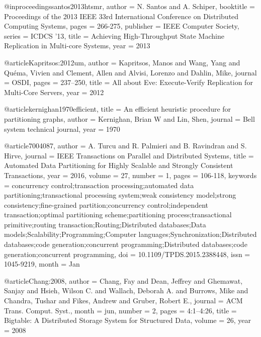 





@inproceedings{santos2013htsmr,
  author    = {N. Santos and A. Schiper},
  booktitle = {Proceedings of the 2013 IEEE 33rd International Conference on Distributed Computing Systems},
  pages     = {266-275},
  publisher = {{IEEE} Computer Society},
  series    = {ICDCS '13},
  title     = {Achieving High-Throughput State Machine Replication in Multi-core Systems},
  year      = {2013}
}

@article{Kapritsos:2012um,
  author  = {Kapritsos, Manos and Wang, Yang and Qu{\'e}ma, Vivien and Clement, Allen and Alvisi, Lorenzo and Dahlin, Mike},
  journal = {OSDI},
  pages   = {237--250},
  title   = {{All about Eve: Execute-Verify Replication for Multi-Core Servers}},
  year    = {2012}
}

@article{kernighan1970efficient,
  title   = {An efficient heuristic procedure for partitioning graphs},
  author  = {Kernighan, Brian W and Lin, Shen},
  journal = {Bell system technical journal},
  year    = {1970}
}

@article{7004087,
  author   = {A. {Turcu} and R. {Palmieri} and B. {Ravindran} and S. {Hirve}},
  journal  = {IEEE Transactions on Parallel and Distributed Systems},
  title    = {Automated Data Partitioning for Highly Scalable and Strongly Consistent Transactions},
  year     = {2016},
  volume   = {27},
  number   = {1},
  pages    = {106-118},
  keywords = {concurrency control;transaction processing;automated data partitioning;transactional processing system;weak consistency model;strong consistency;fine-grained partition;concurrency control;independent transaction;optimal partitioning scheme;partitioning process;transactional primitive;routing transaction;Routing;Distributed databases;Data models;Scalability;Programming;Computer languages;Synchronization;Distributed databases;code generation;concurrent programming;Distributed databases;code generation;concurrent programming},
  doi      = {10.1109/TPDS.2015.2388448},
  issn     = {1045-9219},
  month    = {Jan}
}

@article{Chang:2008,
  author  = {Chang, Fay and Dean, Jeffrey and Ghemawat, Sanjay and Hsieh, Wilson C. and Wallach, Deborah A. and Burrows, Mike and Chandra, Tushar and Fikes, Andrew and Gruber, Robert E.},
  journal = {ACM Trans. Comput. Syst.},
  month   = jun,
  number  = {2},
  pages   = {4:1--4:26},
  title   = {Bigtable: A Distributed Storage System for Structured Data},
  volume  = {26},
  year    = {2008}
}

